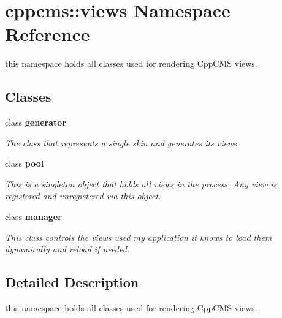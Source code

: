 \section{cppcms\-:\-:views Namespace Reference}
\label{namespacecppcms_1_1views}


this namespace holds all classes used for rendering Cpp\-C\-M\-S views.  


\subsection*{Classes}
\begin{DoxyCompactItemize}
\item 
class {\bf generator}
\begin{DoxyCompactList}\small\item\em The class that represents a single skin and generates its views. \end{DoxyCompactList}\item 
class {\bf pool}
\begin{DoxyCompactList}\small\item\em This is a singleton object that holds all views in the process. Any view is registered and unregistered via this object. \end{DoxyCompactList}\item 
class {\bf manager}
\begin{DoxyCompactList}\small\item\em This class controls the views used my application it knows to load them dynamically and reload if needed. \end{DoxyCompactList}\end{DoxyCompactItemize}


\subsection{Detailed Description}
this namespace holds all classes used for rendering Cpp\-C\-M\-S views. 